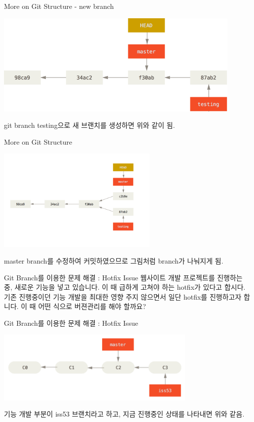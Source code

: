 \documentclass{beamer}
\begin{document}
\begin{frame}{More on Git Structure - new branch} 

\begin{center}
\includegraphics[height=5cm,keepaspectratio]{checkout-master}
\end{center}
git branch testing으로 새 브랜치를 생성하면 위와 같이 됨. 
\end{frame}


\begin{frame}{More on Git Structure} 
\begin{center}
\includegraphics[height=5cm,keepaspectratio]{advance-master} \\
\end{center}
master branch를 수정하여 커밋하였으므로 그림처럼 branch가 나눠지게 됨. 
\end{frame}


\begin{frame}{Git Branch를 이용한 문제 해결 : Hotfix Issue}
웹사이트 개발 프로젝트를 진행하는 중, 새로운 기능을 넣고 있습니다. 이 때 급하게 고쳐야 하는 hotfix가 있다고 합시다. 기존 진행중이던 기능 개발을 최대한 영향 주지 않으면서 일단 hotfix를 진행하고자 합니다. 이 때 어떤 식으로 버젼관리를 해야 할까요?  
\end{frame}

\begin{frame}{Git Branch를 이용한 문제 해결 : Hotfix Issue} 

\begin{center}
\includegraphics[height=3.5cm,keepaspectratio]{develop}  \\
\end{center}
기능 개발 부분이 iss53 브랜치라고 하고, 지금 진행중인 상태를 나타내면 위와 같음. 
\end{frame}
\end{document}
